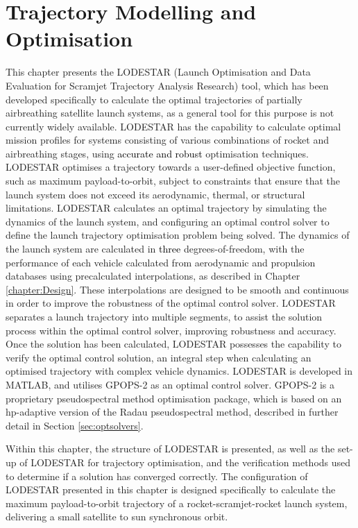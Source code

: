 
\cleardoublepage
\chapter{Trajectory Modelling and Optimisation}\label{chapter:LODESTAR}
			
This chapter presents the LODESTAR (Launch Optimisation and Data Evaluation for Scramjet Trajectory Analysis Research) tool, which has been developed specifically to calculate the optimal trajectories of partially airbreathing satellite launch systems, as a general tool for this purpose is not currently widely available. LODESTAR has the capability to calculate optimal mission profiles for systems consisting of various combinations of rocket and airbreathing stages, using \textcolor{black}{accurate and robust} optimisation techniques. 
LODESTAR optimises a trajectory towards a user-defined objective function, such as maximum payload-to-orbit, subject to constraints that ensure that the launch system does not exceed its aerodynamic, thermal, or structural limitations.
LODESTAR calculates an optimal trajectory by simulating the dynamics of the launch system, and configuring an optimal control solver to define the launch trajectory optimisation problem being solved. 
The dynamics of the launch system are calculated in \textcolor{black}{three} degrees-of-freedom, with the performance of each vehicle calculated from aerodynamic and propulsion databases using precalculated interpolations, as described in Chapter \ref{chapter:Design}. These interpolations are designed to be smooth and continuous in order to improve the robustness of the optimal control solver.
LODESTAR separates a launch trajectory into multiple segments, to assist the solution process within the optimal control solver, improving robustness and accuracy. 
Once the solution has been calculated, LODESTAR possesses the capability to verify the optimal control solution, an integral step when calculating an optimised trajectory with complex vehicle dynamics. 
LODESTAR is developed in MATLAB, and utilises GPOPS-2\cite{Patterson2015} as an optimal control solver. GPOPS-2 is a proprietary pseudospectral method optimisation package, which is based on an \textsf{hp}-adaptive version of the Radau pseudospectral method, described in further detail in Section \ref{sec:optsolvers}. 


 Within this chapter, the structure of LODESTAR is presented, as well as the set-up of LODESTAR for trajectory optimisation, and the verification methods used to determine if a solution has converged correctly.
 The configuration of LODESTAR presented in this chapter is designed specifically to calculate the maximum payload-to-orbit trajectory of a rocket-scramjet-rocket launch system, delivering a small satellite to sun synchronous orbit. 
 




